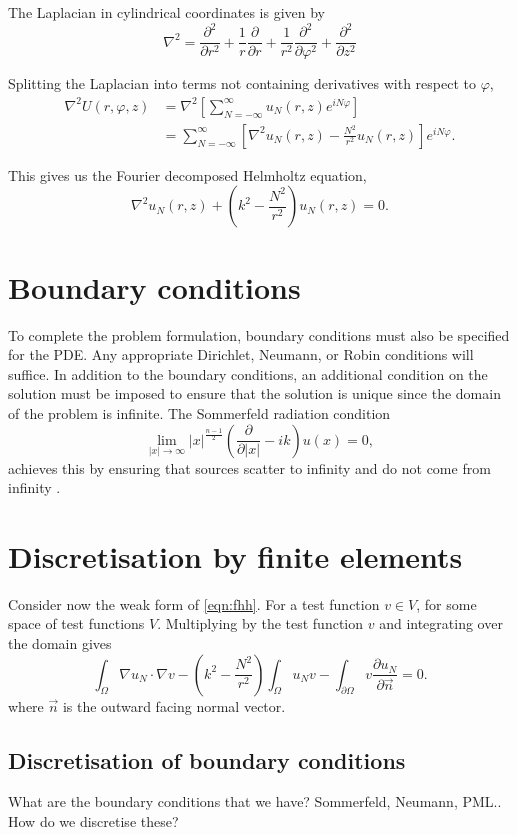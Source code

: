 The Laplacian in cylindrical coordinates is given by
\[
	\nabla^2 = \frac{\partial^2 }{\partial r^2}
			 + \frac{1}{r} \frac{\partial }{\partial r}
			 + \frac{1}{r^2} \frac{\partial^2 }{\partial \varphi^2}
			 + \frac{\partial^2 }{\partial z^2}
\]

Splitting the Laplacian into terms not containing derivatives with respect to $\varphi$,
\begin{align}
	\nabla^2 U(r,\varphi,z) 
		&= \nabla^2 \left[\sum_{N=-\infty}^\infty u_N(r,z) e^{i N \varphi}\right] \\
		&= \sum_{N=-\infty}^\infty \left[ 
										\nabla^2 u_N(r,z) - \frac{N^2}{r^2}u_N(r,z)
								   \right] e^{i N \varphi}.
\end{align}

This gives us the Fourier decomposed Helmholtz equation,
\begin{equation}
	\nabla^2 u_N(r,z) + (k^2 - \frac{N^2}{r^2})u_N(r,z) = 0. \label{eqn:fhh}
\end{equation}


\section{Boundary conditions}

To complete the problem formulation, boundary conditions must also be specified for the PDE.
Any appropriate Dirichlet, Neumann, or Robin conditions will suffice.
In addition to the boundary conditions, an additional condition on the solution must be imposed to ensure that the solution is unique since the domain of the problem is infinite.
The Sommerfeld radiation condition
\[
\lim_{|x|\rightarrow \infty} |x|^{\frac{n-1}{2}} \left( \frac{\partial}{\partial |x|} - ik \right) u(x) = 0,
\]
achieves this by ensuring that sources scatter to infinity and do not come from infinity \cite{sommerfeld}.


\section{Discretisation by finite elements}

Consider now the weak form of \eqref{eqn:fhh}. For a test function $v \in V$, for some space of test functions $V$.
Multiplying by the test function $v$ and integrating over the domain gives
\begin{equation}
	\int_\Omega \nabla u_N \cdot \nabla v 
  - (k^2 - \frac{N^2}{r^2}) \int_\Omega u_N v 
  - \int_{\partial \Omega} v \frac{\partial u_N}{\partial \vec{n}} = 0.
\end{equation}
where $\vec{n}$ is the outward facing normal vector.



\subsection{Discretisation of boundary conditions}

What are the boundary conditions that we have?
Sommerfeld, Neumann, PML..
How do we discretise these?
